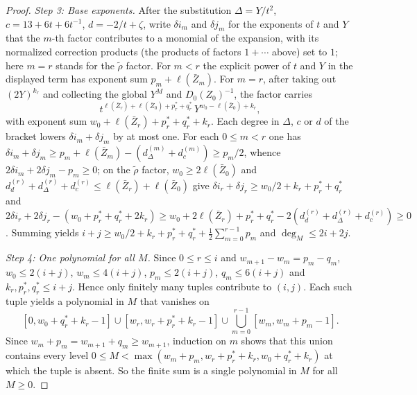 \documentclass[twoside,10pt]{article}
\numberwithin{equation}{section}
\theoremstyle{slbody}
\theoremstyle{definition}
\theoremstyle{remark}
\begin{document}
\begin{proof}
\emph{Step 3: Base exponents.}  After the substitution \(\Delta=Y/t^2\),
\(c=13+6t+6t^{-1}\), \(d=-2/t+\zeta\), write \(\delta i_m\) and \(\delta j_m\)
for the exponents of \(t\) and \(Y\) that the \(m\)-th factor contributes to a
monomial of the expansion, with its normalized correction products (the
products of factors \(1+\cdots\) above) set to \(1\); here \(m=r\) stands for
the \(\widetilde\rho\) factor.  For \(m<r\) the explicit power of \(t\) and
\(Y\) in the displayed term has exponent sum \(p_m+\ell(\bar Z_m)\).  For
\(m=r\), after taking out \((2Y)^{k_r}\) and collecting the global \(Y^M\) and
\(D_0(Z_0)^{-1}\), the factor carries
\[
 t^{\ell(\bar Z_r)+\ell(\bar Z_0)+p_r^*+q_r^*}\,Y^{w_0-\ell(\bar Z_0)+k_r},
\]
with exponent sum \(w_0+\ell(\bar Z_r)+p_r^*+q_r^*+k_r\).  Each degree in
\(\Delta\), \(c\) or \(d\) of the bracket lowers \(\delta i_m+\delta j_m\) by at
most one.  For each \(0\leq m<r\) one has
\(\delta i_m+\delta j_m\geq p_m+\ell(\bar Z_m)-(d_\Delta^{(m)}+d_c^{(m)})\geq p_m/2\),
whence \(2\delta i_m+2\delta j_m-p_m\geq0\); on the \(\widetilde\rho\) factor,
\(w_0\geq2\ell(\bar Z_0)\) and
\(d_d^{(r)}+d_\Delta^{(r)}+d_c^{(r)}\leq\ell(\bar Z_r)+\ell(\bar Z_0)\) give
\(\delta i_r+\delta j_r\geq w_0/2+k_r+p_r^*+q_r^*\) and
\(2\delta i_r+2\delta j_r-(w_0+p_r^*+q_r^*+2k_r)
\geq w_0+2\ell(\bar Z_r)+p_r^*+q_r^*-2(d_d^{(r)}+d_\Delta^{(r)}+d_c^{(r)})\geq0\).
Summing yields
\(i+j\geq w_0/2+k_r+p_r^*+q_r^*+\frac12\sum_{m=0}^{r-1}p_m\) and
\(\deg_M\leq2i+2j\).

\emph{Step 4: One polynomial for all \(M\).}  Since \(0\leq r\leq i\) and
\(w_{m+1}-w_m=p_m-q_m\),
\(w_0\leq2(i+j)\), \(w_m\leq4(i+j)\), \(p_m\leq2(i+j)\),
\(q_m\leq6(i+j)\) and \(k_r,p_r^*,q_r^*\leq i+j\).  Hence only finitely many
tuples contribute to \((i,j)\).  Each such tuple yields a polynomial in \(M\)
that vanishes on
\[
 [0,w_0+q_r^*+k_r-1]\cup[w_r,w_r+p_r^*+k_r-1]\cup\bigcup_{m=0}^{r-1}[w_m,w_m+p_m-1].
\]
Since \(w_m+p_m=w_{m+1}+q_m\geq w_{m+1}\), induction on \(m\) shows that this
union contains every level
\(0\leq M<\max(w_m+p_m,w_r+p_r^*+k_r,w_0+q_r^*+k_r)\) at which the tuple is
absent.  So the finite sum is a single polynomial in \(M\) for all
\(M\geq0\).
\end{proof}
\end{document}
